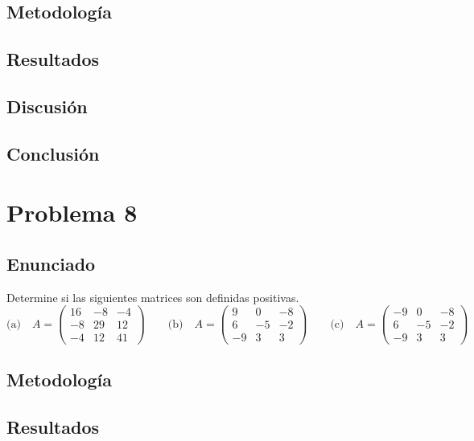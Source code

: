 \documentclass{article}
\begin{document}
\subsection{Metodología}

\subsection{Resultados}
\setcounter{equation}{0}

\subsection{Discusión}

\subsection{Conclusión}

\section{Problema 8}

\subsection{Enunciado}
Determine si las siguientes matrices son definidas positivas.
\[
\text{(a)}\quad
A=\begin{pmatrix}
16 & -8 & -4\\
-8 & 29 & 12\\
-4 & 12 & 41
\end{pmatrix}
\qquad
\text{(b)}\quad
A=\begin{pmatrix}
9 & 0 & -8\\
6 & -5 & -2\\
-9 & 3 & 3
\end{pmatrix}
\qquad
\text{(c)}\quad
A=\begin{pmatrix}
-9 & 0 & -8\\
6 & -5 & -2\\
-9 & 3 & 3
\end{pmatrix}
\]

\subsection{Metodología}

\subsection{Resultados}
\setcounter{equation}{0}
\end{document}
